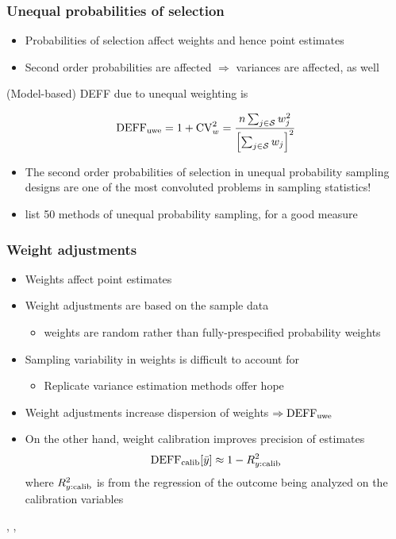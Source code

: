 \documentclass[aspectratio=43]{beamer}
\begin{document}
\begin{frame}\frametitle{Unequal probabilities of selection}

\begin{itemize}
    \item Probabilities of selection affect weights and hence point estimates
    \item Second order probabilities are affected $\Rightarrow$ variances are affected, as well
\end{itemize}

\medskip

(Model-based) DEFF due to unequal weighting is

$$
{\rm DEFF}_{\rm uwe} = 1 + {\rm CV}_w^2 = \frac{n \sum_{j\in\mathcal{S}} w_j^2}{\Bigl[\sum_{j\in\mathcal{S}} w_j\Bigr]^2}
$$

\medskip

\begin{itemize}
    \item The second order probabilities of selection in unequal probability sampling designs
        are one of the most convoluted problems in sampling statistics!
    \item \citet{brewer:hanif:1983} list 50 methods of unequal probability sampling, for a good measure
\end{itemize}


\end{frame}

\begin{frame}\frametitle{Weight adjustments}

\begin{itemize}
    \item Weights affect point estimates
    \item Weight adjustments are based on the sample data
        \begin{itemize} \item weights are random rather than fully-prespecified probability weights \end{itemize}
    \item Sampling variability in weights is difficult to account for
        \begin{itemize}
            \item Replicate variance estimation methods offer hope
        \end{itemize}
    \item Weight adjustments increase dispersion of weights $\Rightarrow {\rm DEFF}_{\rm uwe}$
    \item On the other hand, weight calibration improves precision of estimates
            $$
            {\rm DEFF}_{\rm calib} [\bar y] \approx 1 - R^2_{y:{\rm calib}}
            $$
            where $R^2_{y:{\rm calib}}$ is from the regression of the outcome being analyzed on the calibration variables
\end{itemize}

\medskip

\citet{deville:sarndal:1992},
\citet{henry:valliant:2015},
\citet{devaud:tille:2019}

\end{frame}
\end{document}
